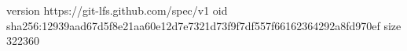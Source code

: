 version https://git-lfs.github.com/spec/v1
oid sha256:12939aad67d5f8e21aa60e12d7e7321d73f9f7df557f66162364292a8fd970ef
size 322360
